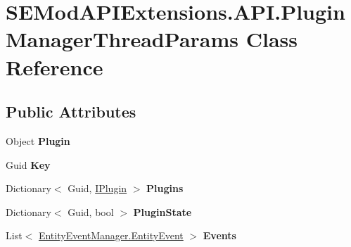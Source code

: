\hypertarget{class_s_e_mod_a_p_i_extensions_1_1_a_p_i_1_1_plugin_manager_thread_params}{}\section{S\+E\+Mod\+A\+P\+I\+Extensions.\+A\+P\+I.\+Plugin\+Manager\+Thread\+Params Class Reference}
\label{class_s_e_mod_a_p_i_extensions_1_1_a_p_i_1_1_plugin_manager_thread_params}
\subsection*{Public Attributes}
\begin{DoxyCompactItemize}
\item 
\hypertarget{class_s_e_mod_a_p_i_extensions_1_1_a_p_i_1_1_plugin_manager_thread_params_ab36afa1ba7e29fe768f6e054ab4b8b30}{}Object {\bfseries Plugin}\label{class_s_e_mod_a_p_i_extensions_1_1_a_p_i_1_1_plugin_manager_thread_params_ab36afa1ba7e29fe768f6e054ab4b8b30}

\item 
\hypertarget{class_s_e_mod_a_p_i_extensions_1_1_a_p_i_1_1_plugin_manager_thread_params_aef773273cf82e706566644b3516733f5}{}Guid {\bfseries Key}\label{class_s_e_mod_a_p_i_extensions_1_1_a_p_i_1_1_plugin_manager_thread_params_aef773273cf82e706566644b3516733f5}

\item 
\hypertarget{class_s_e_mod_a_p_i_extensions_1_1_a_p_i_1_1_plugin_manager_thread_params_a16bb615c2f48a3b0af3a4256ed81309f}{}Dictionary$<$ Guid, \hyperlink{interface_s_e_mod_a_p_i_extensions_1_1_a_p_i_1_1_plugin_1_1_i_plugin}{I\+Plugin} $>$ {\bfseries Plugins}\label{class_s_e_mod_a_p_i_extensions_1_1_a_p_i_1_1_plugin_manager_thread_params_a16bb615c2f48a3b0af3a4256ed81309f}

\item 
\hypertarget{class_s_e_mod_a_p_i_extensions_1_1_a_p_i_1_1_plugin_manager_thread_params_a0ab2926b4b38373996a6940f2f1546da}{}Dictionary$<$ Guid, bool $>$ {\bfseries Plugin\+State}\label{class_s_e_mod_a_p_i_extensions_1_1_a_p_i_1_1_plugin_manager_thread_params_a0ab2926b4b38373996a6940f2f1546da}

\item 
\hypertarget{class_s_e_mod_a_p_i_extensions_1_1_a_p_i_1_1_plugin_manager_thread_params_af3dfee829cc0f0a8e56bf5d28e337699}{}List$<$ \hyperlink{struct_s_e_mod_a_p_i_internal_1_1_a_p_i_1_1_common_1_1_entity_event_manager_1_1_entity_event}{Entity\+Event\+Manager.\+Entity\+Event} $>$ {\bfseries Events}\label{class_s_e_mod_a_p_i_extensions_1_1_a_p_i_1_1_plugin_manager_thread_params_af3dfee829cc0f0a8e56bf5d28e337699}


\end{DoxyCompactItemize}
